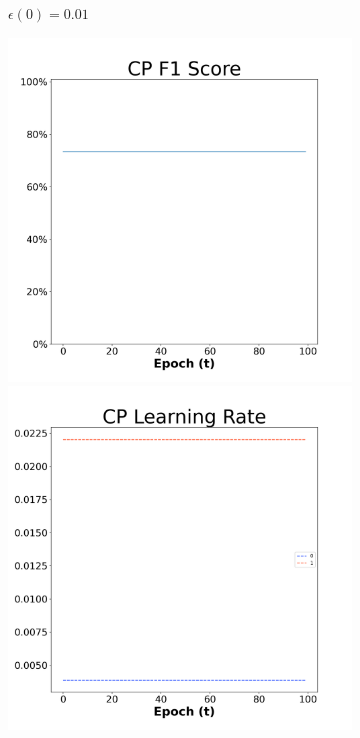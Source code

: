 \begin{figure}[H]
\begin{subfigure}{0.3\textwidth}
\caption{$\epsilon(0)=0.01$}
\end{subfigure}\hfil %
\begin{subfigure}{0.3\textwidth}
\includegraphics[width=\linewidth]{images/exper2/SP/CP_0.03_f1.png}
\includegraphics[width=\linewidth]{images/exper2/SP/CP_0.03_lr.png}

\end{subfigure}
\end{figure}
